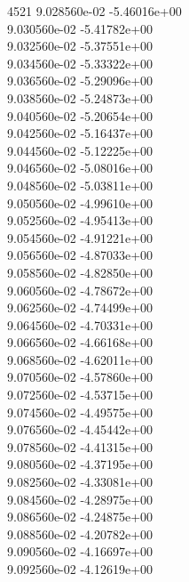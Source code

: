 4521	9.028560e-02	-5.46016e+00	\\ 	9.030560e-02	-5.41782e+00	\\ 	9.032560e-02	-5.37551e+00	\\ 	9.034560e-02	-5.33322e+00	\\ 	9.036560e-02	-5.29096e+00	\\ 	9.038560e-02	-5.24873e+00	\\ 	9.040560e-02	-5.20654e+00	\\ 	9.042560e-02	-5.16437e+00	\\ 	9.044560e-02	-5.12225e+00	\\ 	9.046560e-02	-5.08016e+00	\\ 	9.048560e-02	-5.03811e+00	\\ 	9.050560e-02	-4.99610e+00	\\ 	9.052560e-02	-4.95413e+00	\\ 	9.054560e-02	-4.91221e+00	\\ 	9.056560e-02	-4.87033e+00	\\ 	9.058560e-02	-4.82850e+00	\\ 	9.060560e-02	-4.78672e+00	\\ 	9.062560e-02	-4.74499e+00	\\ 	9.064560e-02	-4.70331e+00	\\ 	9.066560e-02	-4.66168e+00	\\ 	9.068560e-02	-4.62011e+00	\\ 	9.070560e-02	-4.57860e+00	\\ 	9.072560e-02	-4.53715e+00	\\ 	9.074560e-02	-4.49575e+00	\\ 	9.076560e-02	-4.45442e+00	\\ 	9.078560e-02	-4.41315e+00	\\ 	9.080560e-02	-4.37195e+00	\\ 	9.082560e-02	-4.33081e+00	\\ 	9.084560e-02	-4.28975e+00	\\ 	9.086560e-02	-4.24875e+00	\\ 	9.088560e-02	-4.20782e+00	\\ 	9.090560e-02	-4.16697e+00	\\ 	9.092560e-02	-4.12619e+00	\\ \hline
